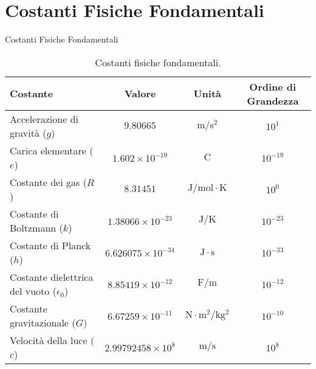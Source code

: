 \documentclass[9pt]{beamer}
\begin{document}
\section{Costanti Fisiche Fondamentali}
\begin{frame}{Costanti Fisiche Fondamentali}
    \small
    \begin{table}[h!]
        \centering
        \begin{tabular}{|l|c|c|c|}
            \hline
            \textbf{Costante} & \textbf{Valore} & \textbf{Unità} & \textbf{Ordine di Grandezza} \\
            \hline
            Accelerazione di gravità ($g$) & $9.80665$ & $\mathrm{m/s^2}$ & $10^{1}$ \\
            Carica elementare ($e$) & $1.602 \times 10^{-19}$ & $\mathrm{C}$ & $10^{-19}$ \\
            Costante dei gas ($R$) & $8.31451$ & $\mathrm{J/mol \cdot K}$ & $10^{0}$ \\
            Costante di Boltzmann ($k$) & $1.38066 \times 10^{-23}$ & $\mathrm{J/K}$ & $10^{-23}$ \\
            Costante di Planck ($h$) & $6.626075 \times 10^{-34}$ & $\mathrm{J \cdot s}$ & $10^{-33}$ \\
            Costante dielettrica del vuoto ($\epsilon_0$) & $8.85419 \times 10^{-12}$ & $\mathrm{F/m}$ & $10^{-12}$ \\
            Costante gravitazionale ($G$) & $6.67259 \times 10^{-11}$ & $\mathrm{N \cdot m^2 / kg^2}$ & $10^{-10}$ \\
            Velocità della luce ($c$) & $2.99792458 \times 10^{8}$ & $\mathrm{m/s}$ & $10^{8}$ \\
            \hline
        \end{tabular}
        \caption{Costanti fisiche fondamentali.}
    \end{table}
\end{frame}

\end{document}
